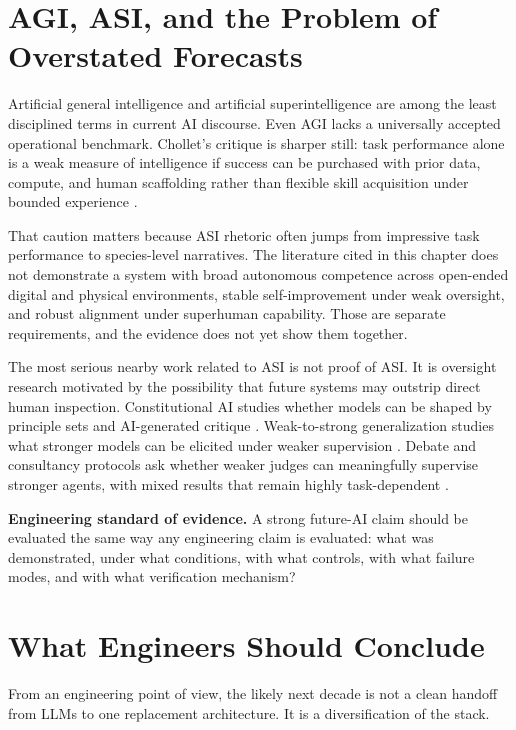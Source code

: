 \documentclass[12pt]{article}
\begin{document}
\section{AGI, ASI, and the Problem of Overstated Forecasts}

Artificial general intelligence and artificial superintelligence are among the least disciplined terms in current AI discourse. Even AGI lacks a universally accepted operational benchmark. Chollet's critique is sharper still: task performance alone is a weak measure of intelligence if success can be purchased with prior data, compute, and human scaffolding rather than flexible skill acquisition under bounded experience \cite{chollet2019measure}.

That caution matters because ASI rhetoric often jumps from impressive task performance to species-level narratives. The literature cited in this chapter does not demonstrate a system with broad autonomous competence across open-ended digital and physical environments, stable self-improvement under weak oversight, and robust alignment under superhuman capability. Those are separate requirements, and the evidence does not yet show them together.

The most serious nearby work related to ASI is not proof of ASI. It is oversight research motivated by the possibility that future systems may outstrip direct human inspection. Constitutional AI studies whether models can be shaped by principle sets and AI-generated critique \cite{bai2022constitutional}. Weak-to-strong generalization studies what stronger models can be elicited under weaker supervision \cite{burns2023weaktostrong}. Debate and consultancy protocols ask whether weaker judges can meaningfully supervise stronger agents, with mixed results that remain highly task-dependent \cite{kenton2024scalableoversight}.

\begin{def-box}
\textbf{Engineering standard of evidence.} A strong future-AI claim should be evaluated the same way any engineering claim is evaluated: what was demonstrated, under what conditions, with what controls, with what failure modes, and with what verification mechanism?
\end{def-box}

\section{What Engineers Should Conclude}

From an engineering point of view, the likely next decade is not a clean handoff from LLMs to one replacement architecture. It is a diversification of the stack.
\end{document}
